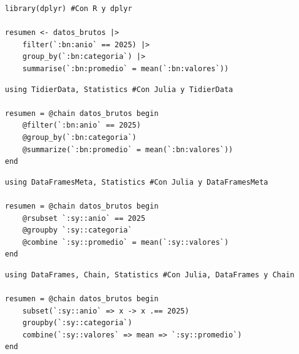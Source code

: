 \documentclass[8pt]{beamer}
\begin{document}
	
	\begin{frame}[fragile]
\begin{lstlisting}[style=RScript]
library(dplyr) #Con R y dplyr

resumen <- datos_brutos |>
	filter(`:bn:anio` == 2025) |>
	group_by(`:bn:categoria`) |>
	summarise(`:bn:promedio` = mean(`:bn:valores`))
\end{lstlisting}
		
\begin{lstlisting}[style=JuliaScript]
using TidierData, Statistics #Con Julia y TidierData

resumen = @chain datos_brutos begin
	@filter(`:bn:anio` == 2025)
	@group_by(`:bn:categoria`)
	@summarize(`:bn:promedio` = mean(`:bn:valores`))
end
\end{lstlisting}
		
\begin{lstlisting}[style=JuliaScript]
using DataFramesMeta, Statistics #Con Julia y DataFramesMeta

resumen = @chain datos_brutos begin
	@rsubset `:sy::anio` == 2025
	@groupby `:sy::categoria`
	@combine `:sy::promedio` = mean(`:sy::valores`)
end
\end{lstlisting}

\begin{lstlisting}[style=JuliaScript]
using DataFrames, Chain, Statistics #Con Julia, DataFrames y Chain

resumen = @chain datos_brutos begin
	subset(`:sy::anio` => x -> x .== 2025)
	groupby(`:sy::categoria`)
	combine(`:sy::valores` => mean => `:sy::promedio`)
end
\end{lstlisting}
	\end{frame}
	
	
	
\end{document}
